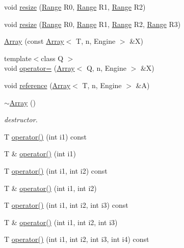 \begin{DoxyCompactItemize}
\item 
void \hyperlink{classArrays_1_1Array_ac992fa179f274c0deeea5d02e0f8ad8a}{resize} (\hyperlink{structArrays_1_1Range}{Range} R0, \hyperlink{structArrays_1_1Range}{Range} R1, \hyperlink{structArrays_1_1Range}{Range} R2)
\item 
void \hyperlink{classArrays_1_1Array_a402ae6a8bac96c5abf3943974a650010}{resize} (\hyperlink{structArrays_1_1Range}{Range} R0, \hyperlink{structArrays_1_1Range}{Range} R1, \hyperlink{structArrays_1_1Range}{Range} R2, \hyperlink{structArrays_1_1Range}{Range} R3)
\item 
\hyperlink{classArrays_1_1Array_af4b4c28a1a56e52ca42cafb9a4184d97}{Array} (const \hyperlink{classArrays_1_1Array}{Array}$<$ T, n, Engine $>$ \&X)
\item 
{\footnotesize template$<$class Q $>$ }\\void \hyperlink{classArrays_1_1Array_a29147dc2ad2a728b91a39350c3455ca6}{operator=} (\hyperlink{classArrays_1_1Array}{Array}$<$ Q, n, Engine $>$ \&X)
\item 
void \hyperlink{classArrays_1_1Array_a3e753144549239a19630c54468d179e9}{reference} (\hyperlink{classArrays_1_1Array}{Array}$<$ T, n, Engine $>$ \&A)
\item 
\hyperlink{classArrays_1_1Array_a050d0dd5deef033b87042cedf33ca25d}{$\sim$\+Array} ()
\begin{DoxyCompactList}\small\item\em destructor. \end{DoxyCompactList}\item 
T \hyperlink{classArrays_1_1Array_a108212be490632b458cf0a484617d308}{operator()} (int i1) const 
\item 
T \& \hyperlink{classArrays_1_1Array_a09c171e6e2d043469bb2eac9e2f51888}{operator()} (int i1)
\item 
T \hyperlink{classArrays_1_1Array_ad43af38ed92df8b2fa894661816149ef}{operator()} (int i1, int i2) const 
\item 
T \& \hyperlink{classArrays_1_1Array_abbb545a6078e83b46dd07397c2a977f5}{operator()} (int i1, int i2)
\item 
T \hyperlink{classArrays_1_1Array_a88f4bf608ee5795494797608f7263a77}{operator()} (int i1, int i2, int i3) const 
\item 
T \& \hyperlink{classArrays_1_1Array_a5083055820529601874467b792bff031}{operator()} (int i1, int i2, int i3)
\item 
T \hyperlink{classArrays_1_1Array_a9ca3a84c9be03145310165f9c81530ee}{operator()} (int i1, int i2, int i3, int i4) const 

\end{DoxyCompactItemize}
